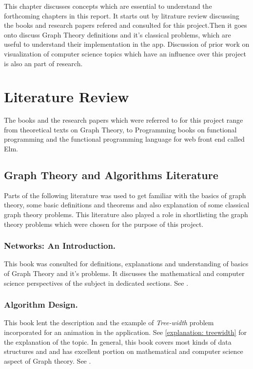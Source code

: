 
This chapter discusses concepts which are essential to understand the
forthcoming chapters in this report. It starts out by litrature review
discussing the books and research papers refered and consulted for this
project.Then it goes onto discuss Graph Theory definitions and it's classical
problems, which are useful to understand their implementation in the app.
Discussion of prior work on visualization of computer science topics which have
an influence over this project is also an part of research.

\section{Literature Review}
The books and the research papers which were referred to for this project range
from theoretical texts on Graph Theory, to Programming books on functional
programming and the functional programming language for web front end called
Elm.

\subsection{Graph Theory and Algorithms Literature}
Parts of the following literature was used to get familiar with the
basics of graph theory, some basic definitions and theorems and also
explanation of some classical graph theory problems. This literature
also played a role in shortlisting the graph theory problems which  
were chosen for the purpose of this project.
\subsubsection{Networks: An Introduction.}
This book was consulted for definitions, explanations and understanding of
basics of Graph Theory and it's problems. It discusses the mathematical and
computer science perspectives of the subject in dedicated sections. See \cite{Newman10}.
\subsubsection{Algorithm Design.}
This book lent the description and the example of \emph{Tree-width} problem
incorporated for an animation in the application.  See \autoref{explanation:
treewidth} for the explanation of the topic. In general, this book covers most
kinds of data structures and and has excellent portion on mathematical and
computer science aspect of Graph theory. See \cite{KleinbergTardos06}.

